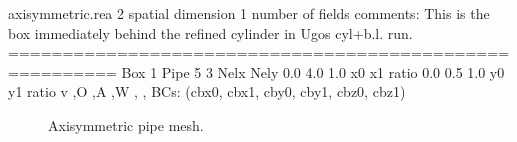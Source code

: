 \documentclass[letterpaper,10pt,english]{sphinxmanual}
\begin{document}
%
\begin{sphinxVerbatim}[commandchars=\\\{\}]
axisymmetric.rea
2                      spatial dimension
1                      number of fields
\PYGZsh{}
\PYGZsh{}    comments:   This is the box immediately behind the
\PYGZsh{}                refined cylinder in Ugo\PYGZsq{}s cyl+b.l. run.
\PYGZsh{}
\PYGZsh{}
\PYGZsh{}========================================================
\PYGZsh{}
Box 1                         Pipe
\PYGZhy{}5 \PYGZhy{}3                         Nelx  Nely
0.0   4.0   1.0               x0  x1   ratio
0.0   0.5   1.0               y0  y1   ratio
v  ,O  ,A  ,W  ,   ,          BC\PYGZsq{}s:  (cbx0, cbx1, cby0, cby1, cbz0, cbz1)
\end{sphinxVerbatim}

\begin{figure}[htbp]
\centering
\capstart

\noindent{}
\caption{Axisymmetric pipe mesh.}\label{\detokenize{appendix:fig-mesh-axi1}}\label{\detokenize{appendix:id3}}\end{figure}
\end{document}
